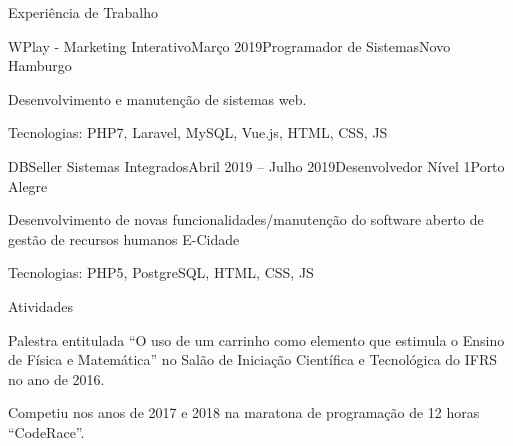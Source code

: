 \documentclass{resume} %
\begin{document}


\begin{rSection}{Experiência de Trabalho}

\begin{rSubsection}{WPlay - Marketing Interativo}{Março 2019}{Programador de Sistemas}{Novo Hamburgo}
\item Desenvolvimento e manutenção de sistemas web.
\item Tecnologias: PHP7, Laravel, MySQL, Vue.js, HTML, CSS, JS
\end{rSubsection}

\begin{rSubsection}{DBSeller Sistemas Integrados}{Abril 2019 -- Julho 2019}{Desenvolvedor Nível 1}{Porto Alegre}
\item Desenvolvimento de novas funcionalidades/manutenção do software aberto de gestão de recursos humanos E-Cidade
\item Tecnologias: PHP5, PostgreSQL, HTML, CSS, JS
\end{rSubsection}

\end{rSection}


\begin{rSection}{Atividades} 
 
 Palestra entitulada ``O uso de um carrinho como elemento que estimula o Ensino de Física e Matemática'' no Salão de Iniciação Científica e Tecnológica do IFRS no ano de 2016.
 
 Competiu nos anos de 2017 e 2018 na maratona de programação de 12 horas ``CodeRace''.
 
 \end{rSection}
\end{document}

